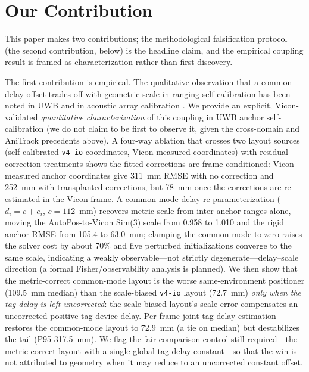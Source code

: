 \documentclass[11pt,a4paper]{article}
\begin{document}
\section{Our Contribution}

This paper makes two contributions; the methodological falsification protocol (the
second contribution, below) is the headline claim, and the empirical coupling result
is framed as characterization rather than first discovery.

The first contribution is empirical. The qualitative observation that a common
delay offset trades off with geometric scale in ranging self-calibration has been
noted in UWB \citep{hamer_2018_self_calibrating_ultra_wideband_network} and in
acoustic array calibration \citep{burgess_2015_toa_self_calibration}. We provide
an explicit, Vicon-validated \emph{quantitative characterization} of this coupling in
UWB anchor self-calibration (we do not claim to be first to observe it, given the
cross-domain and AniTrack precedents above). A four-way ablation that crosses two layout sources (self-calibrated
\texttt{v4-io} coordinates, Vicon-measured coordinates) with residual-correction
treatments shows the fitted corrections are frame-conditioned: Vicon-measured anchor
coordinates give 311~mm RMSE with no correction and 252~mm with transplanted corrections,
but 78~mm once the corrections are re-estimated in the Vicon frame. A common-mode delay
re-parameterization ($d_i = c + e_i$, $c = 112$~mm) recovers metric scale from
inter-anchor ranges alone, moving the AutoPos-to-Vicon Sim(3) scale from 0.958 to 1.010
and the rigid anchor RMSE from 105.4 to 63.0~mm; clamping the common mode to zero raises
the solver cost by about 70\% and five perturbed initializations converge to the same
scale, indicating a weakly observable---not strictly degenerate---delay--scale
direction (a formal Fisher/observability analysis is planned). We then show that the
metric-correct common-mode layout is the worse same-environment positioner (109.5~mm
median) than the scale-biased \texttt{v4-io} layout (72.7~mm) \emph{only when the tag
delay is left uncorrected}: the scale-biased layout's scale error compensates an
uncorrected positive tag-device delay. Per-frame joint tag-delay estimation restores
the common-mode layout to 72.9~mm (a tie on median) but destabilizes the tail
(P95 317.5~mm). We flag the fair-comparison control still required---the metric-correct
layout with a single global tag-delay constant---so that the win is not attributed to
geometry when it may reduce to an uncorrected constant offset.
\end{document}
